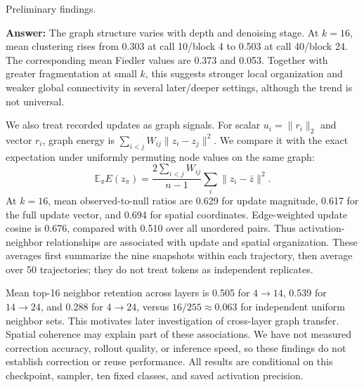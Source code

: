 \item Preliminary findings.
{\color{blue}\textbf{Answer:}
The graph structure varies with depth and denoising stage. At $k=16$,
mean clustering rises from 0.303 at call 10/block 4 to 0.503 at call 40/block 24.
The corresponding mean Fiedler values are 0.373 and 0.053. Together with
greater fragmentation at small $k$, this suggests stronger local organization
and weaker global connectivity in several later/deeper settings, although
the trend is not universal.

We also treat recorded updates as graph signals. For scalar $u_i=\|r_i\|_2$
and vector $r_i$, graph energy is $\sum_{i<j}W_{ij}\|z_i-z_j\|^2$.
We compare it with the exact expectation under uniformly permuting node values
on the same graph:
\[
\mathbb E_{\pi} E(z_{\pi})=
\frac{2\sum_{i<j} W_{ij}}{n-1}
\sum_i\|z_i-\bar z\|^2.
\]
At $k=16$, mean observed-to-null ratios are
0.629 for update magnitude,
0.617 for the full update vector, and
0.694 for spatial coordinates.
Edge-weighted update cosine is 0.676,
compared with 0.510 over all unordered pairs.
Thus activation-neighbor relationships are associated with update and spatial
organization. These averages first summarize the nine snapshots within each
trajectory, then average over 50 trajectories; they do not treat tokens as
independent replicates.

Mean top-16 neighbor retention across layers is
0.505 for $4\to14$,
0.539 for $14\to24$, and
0.288 for $4\to24$, versus $16/255\approx0.063$
for independent uniform neighbor sets. This motivates later investigation
of cross-layer graph transfer. Spatial coherence may explain part of these
associations. We have not measured correction accuracy, rollout quality,
or inference speed, so these findings do not establish correction or reuse
performance. All results are conditional on this checkpoint, sampler,
ten fixed classes, and saved activation precision.
}
